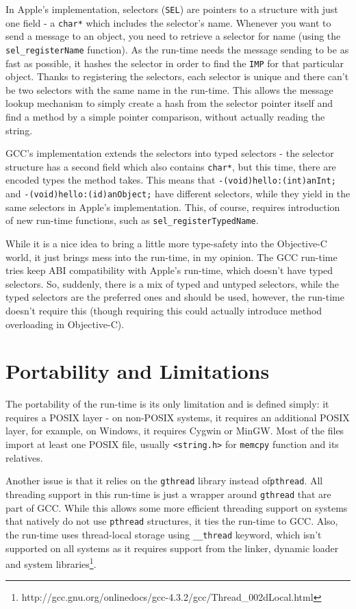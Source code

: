 In Apple's implementation, selectors (\verb=SEL=) are pointers to a structure with just one field - a \verb=char*= which includes the selector's name. Whenever you want to send a message to an object, you need to retrieve a selector for name (using the \verb=sel_registerName= function). As the run-time needs the message sending to be as fast as possible, it hashes the selector in order to find the \verb=IMP= for that particular object. Thanks to registering the selectors, each selector is unique and there can't be two selectors with the same name in the run-time. This allows the message lookup mechanism to simply create a hash from the selector pointer itself and find a method by a simple pointer comparison, without actually reading the string.

GCC's implementation extends the selectors into typed selectors - the selector structure has a second field which also contains \verb=char*=, but this time, there are encoded types the method takes. This means that \verb=-(void)hello:(int)anInt;= and \verb=-(void)hello:(id)anObject;= have different selectors, while they yield in the same selectors in Apple's implementation. This, of course, requires introduction of new run-time functions, such as \verb=sel_registerTypedName=.

While it is a nice idea to bring a little more type-safety into the Objective-C world, it just brings mess into the run-time, in my opinion. The GCC run-time tries keep ABI compatibility with Apple's run-time, which doesn't have typed selectors. So, suddenly, there is a mix of typed and untyped selectors, while the typed selectors are the preferred ones and should be used, however, the run-time doesn't require this (though requiring this could actually introduce method overloading in Objective-C).

\section{Portability and Limitations}

The portability of the run-time is its only limitation and is defined simply: it requires a POSIX layer - on non-POSIX systems, it requires an additional POSIX layer, for example, on Windows, it requires Cygwin or MinGW. Most of the files import at least one POSIX file, usually \verb=<string.h>= for \verb=memcpy= function and its relatives.

Another issue is that it relies on the \verb=gthread= library instead of\verb=pthread=. All threading support in this run-time is just a wrapper around \verb=gthread= that are part of GCC. While this allows some more efficient threading support on systems that natively do not use \verb=pthread= structures, it ties the run-time to GCC. Also, the run-time uses thread-local storage using \verb=__thread= keyword, which isn't supported on all systems as it requires support from the linker, dynamic loader and system libraries\footnote{http://gcc.gnu.org/onlinedocs/gcc-4.3.2/gcc/Thread\_002dLocal.html}.
